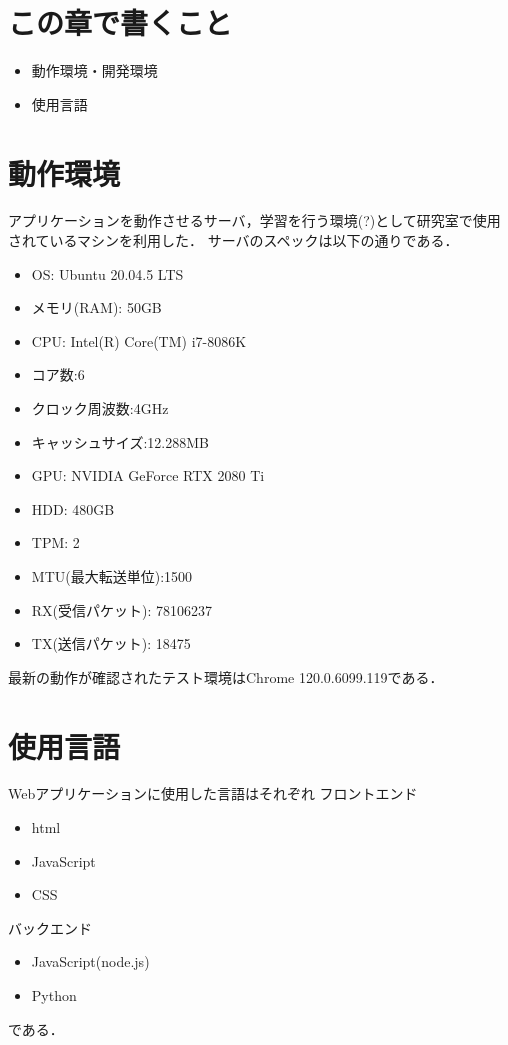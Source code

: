 \section{この章で書くこと}
\begin{itemize}
	\item 動作環境・開発環境
	\item 使用言語
	
\end{itemize}

\section{動作環境}
アプリケーションを動作させるサーバ，学習を行う環境(?)として研究室で使用されているマシンを利用した．
サーバのスペックは以下の通りである．
\begin{itemize} 
\item OS: Ubuntu 20.04.5 LTS 
\item メモリ(RAM): 50GB 
\item CPU: Intel(R) Core(TM) i7-8086K 
\item コア数:6
\item クロック周波数:4GHz
\item キャッシュサイズ:12.288MB
\item GPU: NVIDIA GeForce RTX 2080 Ti 
\item HDD: 480GB 
\item TPM: 2
\item MTU(最大転送単位):1500
\item RX(受信パケット): 78106237
\item TX(送信パケット): 18475
\end{itemize}

最新の動作が確認されたテスト環境はChrome 120.0.6099.119である．



\section{使用言語}
Webアプリケーションに使用した言語はそれぞれ
フロントエンド
\begin{itemize}
\item html
\item JavaScript
\item CSS
\end{itemize}
バックエンド
\begin{itemize}
\item JavaScript(node.js)
\item Python
\end{itemize}
である．

